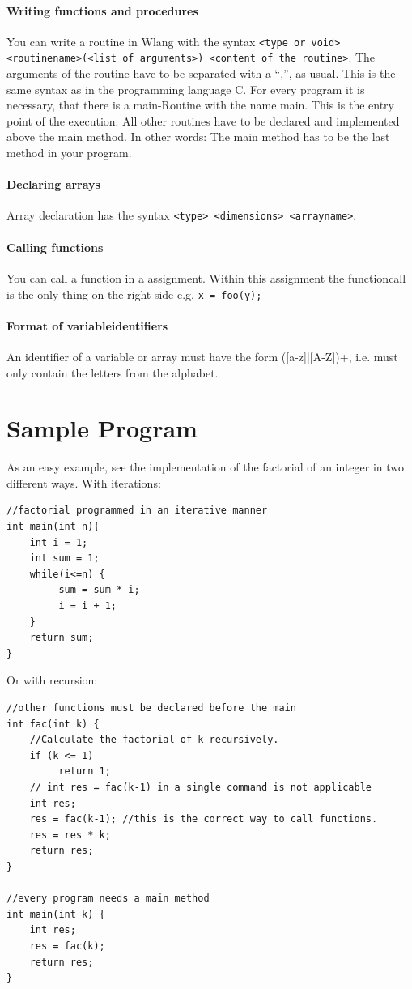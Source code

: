 \documentclass[parskip=full]{memoir}
\begin{document}
\paragraph{Writing functions and procedures}
You can write a routine in Wlang with the syntax \texttt{<type or void> <routinename>(<list of arguments>) <content of the routine>}.
The arguments of the routine have to be separated with a \enquote{,}, as usual. This is the same syntax as in the programming language C. For every program it is necessary, that there is a main-Routine with the name main. This is the entry point of the execution. All other routines have to be declared and implemented above the main method. In other words: The main method has to be the last method in your program.
\paragraph{Declaring arrays}
Array declaration has the syntax \texttt{<type> <dimensions> <arrayname>}. 
\paragraph{Calling functions}
You can call a function in a assignment. Within this assignment the functioncall is the only thing on the right side e.g. \texttt{x = foo(y);}
\paragraph{Format of variableidentifiers}
An identifier of a variable or array must have the form ([a-z]|[A-Z])+, i.e. must only contain the letters from the alphabet.
\section{Sample Program}
As an easy example, see the implementation of the factorial of an integer in two different ways.
With iterations:
\begin{verbatim}
//factorial programmed in an iterative manner
int main(int n){
    int i = 1;
    int sum = 1;
    while(i<=n) {
         sum = sum * i;
         i = i + 1;
    }
    return sum;
}
\end{verbatim}

Or with recursion:

\begin{verbatim}
//other functions must be declared before the main
int fac(int k) {
    //Calculate the factorial of k recursively.
    if (k <= 1)
         return 1;
    // int res = fac(k-1) in a single command is not applicable
    int res;
    res = fac(k-1); //this is the correct way to call functions.
    res = res * k;
    return res;
}

//every program needs a main method
int main(int k) {
    int res;
    res = fac(k);
    return res;
}
\end{verbatim}
\end{document}
